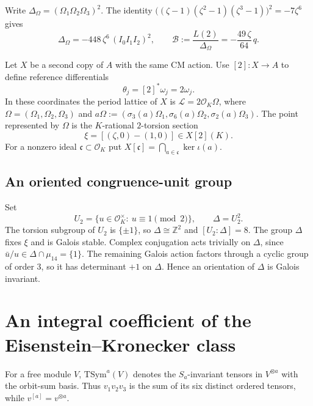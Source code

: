 \documentclass[11pt]{amsart}
\theoremstyle{remark}
\theoremstyle{definition}
\newcommand{\Z}{\mathbb{Z}}
\newcommand{\OK}{\mathcal{O}_K}
\newcommand{\TSym}{\mathrm{TSym}}
\newcommand{\Lat}{\mathcal{L}}
\newcommand{\Bn}{\mathcal{B}}
\begin{document}
Write $\Delta_\Omega=(\Omega_1\Omega_2\Omega_3)^2$. The identity $\bigl((\zeta-1)(\zeta^2-1)(\zeta^3-1)\bigr)^2=-7\zeta^6$ gives
\begin{equation}\label{eq:B}
\Delta_\Omega=-448\,\zeta^6\,(I_0I_1I_2)^2,\qquad \Bn:=\frac{L(2)}{\Delta_\Omega}=-\frac{49\,\zeta}{64}\,q.
\end{equation}

Let $X$ be a second copy of $A$ with the same CM action. Use $[2]\colon X\to A$ to define reference differentials
\begin{equation}\label{eq:theta}
\theta_j=[2]^*\omega_j=2\omega_j.
\end{equation}
In these coordinates the period lattice of $X$ is $\Lat=2\OK\Omega$, where $\Omega=(\Omega_1,\Omega_2,\Omega_3)$ and $a\Omega:=(\sigma_3(a)\Omega_1,\sigma_6(a)\Omega_2,\sigma_2(a)\Omega_3)$. The point represented by $\Omega$ is the $K$-rational $2$-torsion section
\[
\xi=[(\zeta,0)-(1,0)]\in X[2](K).
\]
For a nonzero ideal $\mathfrak c\subset\OK$ put $X[\mathfrak c]=\bigcap_{a\in\mathfrak c}\ker\iota(a)$.

\subsection{An oriented congruence-unit group}
Set
\begin{equation}\label{eq:Delta}
U_2=\{u\in\OK^\times:\ u\equiv1\pmod 2\},\qquad \Delta=U_2^2.
\end{equation}
The torsion subgroup of $U_2$ is $\{\pm1\}$, so $\Delta\cong\Z^2$ and $[U_2:\Delta]=8$. The group $\Delta$ fixes $\xi$ and is Galois stable. Complex conjugation acts trivially on $\Delta$, since $\bar u/u\in\Delta\cap\mu_{14}=\{1\}$. The remaining Galois action factors through a cyclic group of order $3$, so it has determinant $+1$ on $\Delta$. Hence an orientation of $\Delta$ is Galois invariant.

\section{An integral coefficient of the Eisenstein--Kronecker class}\label{sec:EK}

For a free module $V$, $\TSym^a(V)$ denotes the $S_a$-invariant tensors in $V^{\otimes a}$ with the orbit-sum basis. Thus $v_1v_2v_3$ is the sum of its six distinct ordered tensors, while $v^{[a]}=v^{\otimes a}$.
\end{document}

